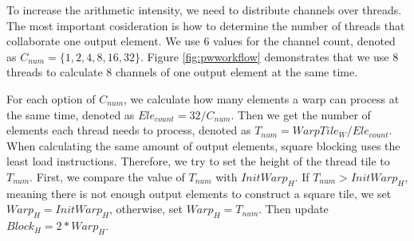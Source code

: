 To increase the arithmetic intensity, we need to distribute channels over threads. The most important cosideration is how to determine the number of threads that collaborate one output element. We use 6 values for the channel count, denoted as $C_{num}=\{1,2,4,8,16,32\}$. 
Figure \ref{fig:pwworkflow} demonstrates that we use 8 threads to calculate 8 channels of one output element at the same time. 

For each option of $C_{num}$, we calculate how many elements a warp can process at the same time, denoted as $Ele_{count}=32/C_{num}$. 
Then we get the number of elements each thread needs to process, denoted as $T_{num}=WarpTile_W/Ele_{count}$.
When calculating the same amount of output elements, square blocking uses the least load instructions. 
Therefore, we try to set the height of the thread tile to $T_{num}$.
First, we compare the value of $T_{num}$ with $InitWarp_H$.
If $T_{num}>InitWarp_H$, meaning there is not enough output elements to construct a square tile, we set $Warp_H=InitWarp_H$, otherwise, set $Warp_H=T_{num}$.
Then update $Block_H=2*Warp_H$.

